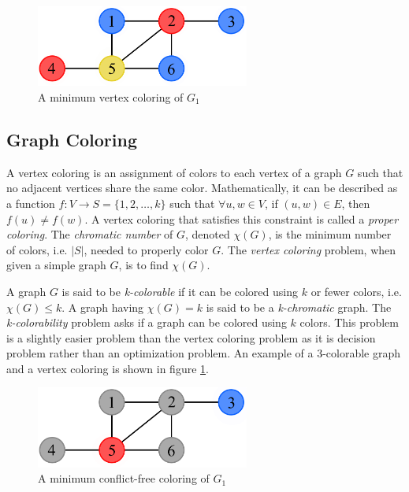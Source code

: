 \documentclass{sig-alternate}
\begin{document}
\begin{figure}[h]
	\centering
	\includegraphics[width=7cm]{../figures/example-vcp.pdf}
	\caption{A minimum vertex coloring of $G_1$}\label{fig:vcp-example}
\end{figure}


\subsection{Graph Coloring}
\label{sec:coloring}
A vertex coloring is an assignment of colors to each vertex of a graph $G$ such that no adjacent vertices share the same color. Mathematically, it can be described as a function $f : V \rightarrow S = \{1, 2, \dots, k\}$ such that $\forall u,w \in V$, if $(u,w) \in E$, then $f(u) \neq f(w)$. A vertex coloring that satisfies this constraint is called a \emph{proper coloring}. The \emph{chromatic number} of $G$, denoted $\chi(G)$, is the minimum number of colors, i.e. $|S|$, needed to properly color $G$. The \emph{vertex coloring} problem, when given a simple graph $G$, is to find $\chi(G)$. \cite{bondy1976graph}

A graph $G$ is said to be \emph{k-colorable} if it can be colored using $k$ or fewer colors, i.e. $\chi(G) \leq k$. A graph having $\chi(G) = k$ is said to be a \emph{k-chromatic} graph. The \emph{k-colorability} problem asks if a graph can be colored using $k$ colors. This problem is a slightly easier problem than the vertex coloring problem as it is decision problem rather than an optimization problem. An example of a 3-colorable graph and a vertex coloring is shown in figure \ref{fig:vcp-example}.

\begin{figure}[h]
	\centering
	\includegraphics[width=7cm]{../figures/example-cfcp.pdf}
	\caption{A minimum conflict-free coloring of $G_1$}\label{fig:cfcp-example}
\end{figure}
\end{document}

